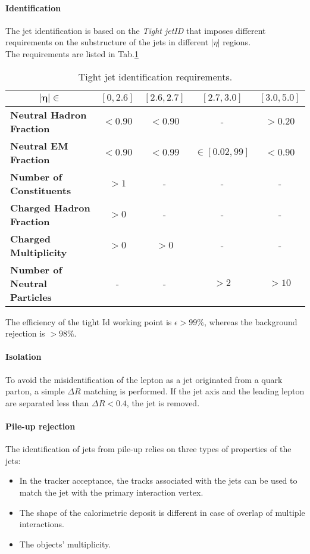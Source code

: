 \paragraph*{Identification}
The jet identification is based on the \emph{Tight jetID} that imposes different requirements on the substructure of the jets in different $|\eta|$ regions.\\
The requirements are listed in Tab.\ref{tab:jet_id}

\begin{table}[H]
    \centering
    \fontsize{11pt}{11pt}\selectfont
    \begin{tabular}{l|c|c|c|c}
        \toprule
         \multicolumn{1}{c|}{$\bm{|\eta|\in}$}&  $[0,2.6]$& $[2.6,2.7]$ & $[2.7,3.0]$ & $[3.0,5.0]$\\
         \midrule
         \textbf{Neutral Hadron Fraction} & $<0.90$ &  $<0.90$ & - & $>0.20$\\
         \midrule
         \textbf{Neutral EM Fraction} & $<0.90$ & $<0.99$ & $\in[0.02,99]$ & $<0.90$\\
         \midrule
         \textbf{Number of Constituents } & $>1$ & - & - &  -\\
         \midrule
         \textbf{Charged Hadron Fraction} & $>0$ & - & - & -\\
         \midrule
         \textbf{Charged Multiplicity} & $>0$ & $>0$ & - & -\\
         \midrule
         \textbf{Number of Neutral Particles}& - & - & $>2$ & $>10$\\
         \bottomrule
    \end{tabular}
    \caption{Tight jet identification requirements.}
    \label{tab:jet_id}
\end{table}
The efficiency of the tight Id working point is $\epsilon>99\%$, whereas the background rejection is $>98\%$. 
\paragraph*{Isolation} 
To avoid the misidentification of the lepton as a jet originated from a quark parton, a simple $\Delta R$ matching is performed. If the jet axis and the leading lepton are separated less than $\Delta R<0.4$, the jet is removed. 

\paragraph*{Pile-up rejection}
The identification of jets from pile-up relies on three types of properties of the jets:
\begin{itemize}
    \item  In the tracker acceptance, the tracks associated with the jets can be used to match the jet with the primary interaction vertex.
    \item The shape of the calorimetric deposit is different in case of overlap of multiple interactions.
    \item The objects' multiplicity.
\end{itemize}


